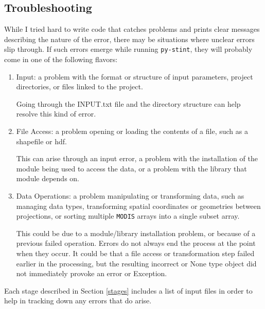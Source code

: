 \documentclass[twoside,a4paper]{refart}
\begin{document}
\subsection{Troubleshooting}
While I tried hard to write code that catches problems and prints clear messages describing the nature of the error, there may be situations where unclear errors slip through.  If such errors emerge while running \texttt{py-stint}, they will probably come in one of the following flavors:
\begin{enumerate}
  \item
    Input: a problem with the format or structure of input parameters, 
    project directories, or files linked to the project.  
    
    Going through the INPUT.txt file and the directory structure 
    can help resolve this kind of error.
  \item
    File Access: a problem opening or loading the contents of a file, 
    such as a shapefile or hdf.  
    
    This can arise through an input error, a problem with the 
    installation of the module being used to access the data,
    or a problem with the library that module depends on.
  \item
    Data Operations: a problem manipulating or transforming data, 
    such as managing data types, transforming spatial coordinates or 
    geometries between projections, or sorting multiple 
    \texttt{MODIS} arrays into a single subset array.
    
    This could be due to a module/library installation problem, or 
    because of a previous failed operation. Errors do not always end the process 
    at the point when they occur. It could be that a file access or 
    transformation step failed earlier in the processing, but the 
    resulting incorrect or None type object did not immediately provoke an 
    error or Exception.
    
\end{enumerate}

Each stage described in Section \ref{stages} includes a list of input files in order to help in tracking down any errors that do arise.

\end{document}
